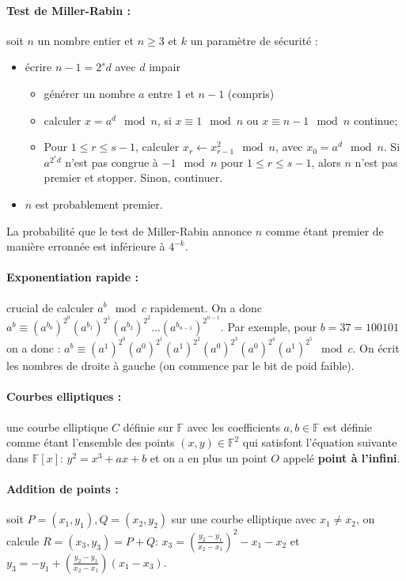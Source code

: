 \documentclass[11pt,a4paper]{report}
\newcommand{\f}{\mathbb{F}}
\begin{document}
\paragraph*{Test de Miller-Rabin :} soit $n$ un nombre entier et $n\geq 3$ et $k$ un paramètre de sécurité :
\begin{itemize}
    \item écrire $n-1=2^sd$ avec $d$ impair
    \begin{itemize}
        \item générer un nombre $a$ entre $1$ et $n-1$ (compris)
        \item calculer $x=a^d\mod n$, si $x\equiv1\mod n$ ou $x\equiv n-1 \mod n$ continue;
        \item Pour $1 \leq r \leq s-1$, calculer $x_r \leftarrow x^2_{r-1}\mod n$, avec $x_0=a^d\mod n$. Si $a^{2^rd}$ n'est pas congrue à $-1 \mod n$ pour $1 \leq r \leq s-1$, alors $n$ n'est pas premier et stopper. Sinon, continuer. 
    \end{itemize}
    \item $n$ est probablement premier.
\end{itemize}

La probabilité que le test de Miller-Rabin annonce $n$ comme étant premier de manière erronnée est inférieure à $4^{-k}$.

\paragraph*{Exponentiation rapide :} crucial de calculer $a^b\mod c$ rapidement. On a donc $a^b \equiv (a^{b_0})^{2^0}(a^{b_1})^{2^1}(a^{b_2})^{2^2}...(a^{b_{n-1}})^{2^{n-1}}$. Par exemple, pour $b= 37 = 100101$ on a donc : $a^b \equiv (a^1)^{2^0} (a^0)^{2^1} (a^1)^{2^2} (a^0)^{2^3} (a^0)^{2^4} (a^1)^{2^5} \mod c$. On écrit les nombres de droite à gauche (on commence par le bit de poid faible).

\paragraph*{Courbes elliptiques :} une courbe elliptique $C$ définie sur $\f$ avec les coefficients $a,b\in\f$ est définie comme étant l'ensemble des points $(x,y)\in\f^2$ qui satisfont l'équation suivante dans $\f[x]$: $y^2=x^3+ax+b$ et on a en plus un point $O$ appelé \textbf{point à l'infini}.

\paragraph*{Addition de points :} soit $P=(x_1,y_1),Q=(x_2,y_2)$ sur une courbe elliptique avec $x_1\neq x_2$, on calcule $R=(x_3,y_3)=P+Q$: $x_3=(\frac{y_2-y_1}{x_2-x_1})^2-x_1-x_2$ et $y_3=-y_1+(\frac{y_2-y_1}{x_2-x_1})(x_1-x_3)$.
\end{document}
